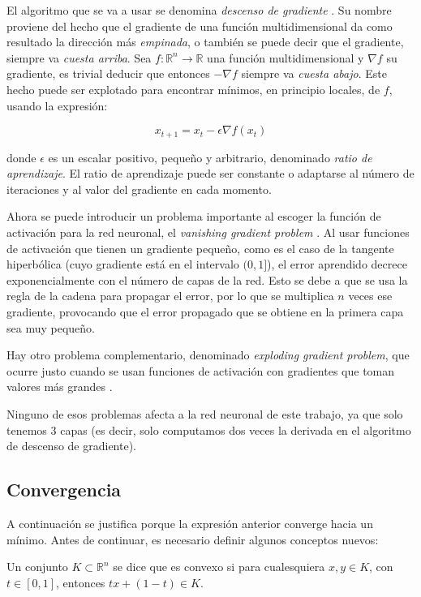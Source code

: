 El algoritmo que se va a usar se denomina \textit{descenso de gradiente} \cite{lemarechal2012cauchy}.
Su nombre proviene del hecho
que el gradiente de una función multidimensional da como resultado la dirección más \textit{empinada},
o también se puede decir que el gradiente, siempre va \textit{cuesta arriba}. Sea $f \colon \mathbb{R}^n \longrightarrow \mathbb{R}$
una función multidimensional y $\nabla f$ su gradiente, es trivial deducir que entonces $-\nabla f$
siempre va \textit{cuesta abajo}. Este hecho puede ser explotado para encontrar mínimos, en principio locales,
de $f$, usando la expresión:

\begin{equation}
    \label{eqn:gradient_descent}
    x_{t+1}=x_t-\epsilon\nabla f(x_t)
\end{equation}

donde $\epsilon$ es un escalar positivo, pequeño y arbitrario, denominado \textit{ratio de aprendizaje}.
El ratio de aprendizaje puede ser constante o adaptarse al número de iteraciones y al valor del gradiente en cada momento.

Ahora se puede introducir un problema importante al escoger la función de activación para la red neuronal, el \textit{vanishing gradient problem} \cite{hochreiter1991untersuchungen}.
Al usar funciones de activación que tienen un gradiente pequeño, como es el caso de la tangente hiperbólica (cuyo gradiente está en el intervalo $(0,1]$), el error aprendido decrece exponencialmente
con el número de capas de la red. Esto se debe a que se usa la regla de la cadena para propagar el error, por lo que se multiplica $n$ veces ese gradiente, provocando que el error propagado que se obtiene
en la primera capa sea muy pequeño.

Hay otro problema complementario, denominado \textit{exploding gradient problem}, que ocurre justo cuando se usan funciones de activación con gradientes que toman valores más grandes \cite{philipp2017exploding}.

Ninguno de esos problemas afecta a la red neuronal de este trabajo, ya que solo tenemos 3 capas (es decir, solo computamos dos veces la derivada en el algoritmo de descenso de gradiente).

\subsection*{Convergencia}

A continuación se justifica porque la expresión anterior converge hacia un mínimo. Antes de continuar, es necesario definir algunos
conceptos nuevos:
\begin{definition}
    Un conjunto $K\subset \mathbb{R}^n$ se dice que es convexo si para cualesquiera $x,y\in K$, con $t\in[0,1]$, entonces $tx+(1-t)\in K$.
\end{definition}

